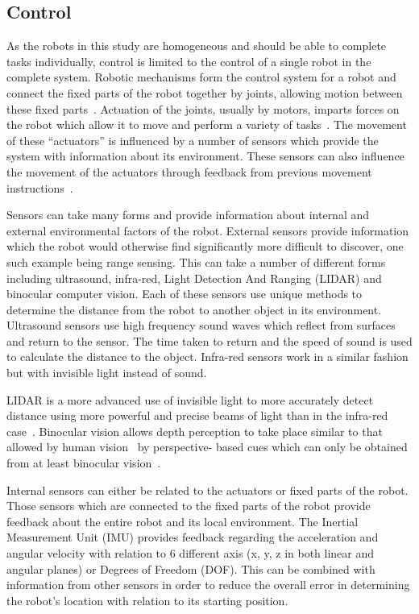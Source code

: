 \subsection{Control}\label{litreview/robotics/control}  
As the robots in this study are homogeneous and should be able to complete 
tasks individually, control is limited to the control of a single robot in the 
complete system. Robotic mechanisms form the control system for a robot and 
connect the fixed parts of the robot together by joints, allowing motion between 
these fixed parts~\cite{lynch2017modern}. Actuation of the joints, usually 
by motors, imparts forces on the robot which allow it to move and perform a 
variety of tasks~\cite{lynch2017modern}. The movement of these ``actuators'' 
is influenced by a number of sensors which provide the system with information 
about its environment. These sensors can also influence the movement of the 
actuators through feedback from previous movement instructions~\cite{lynch2017modern}.    

Sensors can take many forms and provide information about internal and external 
environmental factors of the robot. External sensors provide information which 
the robot would otherwise find significantly more difficult to discover, one 
such example being range sensing. This can take a number of different forms 
including ultrasound, infra-red, Light Detection And Ranging (LIDAR) and 
binocular computer vision. Each of these sensors use unique methods to determine 
the distance from the robot to another object in its environment. Ultrasound 
sensors use high frequency sound waves which reflect from surfaces and return 
to the sensor. The time taken to return and the speed of sound is used to 
calculate the distance to the object. Infra-red sensors work in a similar 
fashion but with invisible light instead of sound. 

LIDAR is a more advanced use of invisible light to more accurately detect 
distance using more powerful and precise beams of light than in the infra-red 
case~\cite{lidar}. Binocular vision allows depth perception to take place 
similar to that allowed by human vision~\cite{read2005early} by perspective-
based cues which can only be obtained from at least binocular 
vision~\cite{pfautz2002depth}. 

Internal sensors can either be related to the actuators or fixed parts of the 
robot. Those sensors which are connected to the fixed parts of the robot provide 
feedback about the entire robot and its local environment. The Inertial 
Measurement Unit (IMU) provides feedback regarding the acceleration and angular 
velocity with relation to 6 different axis (x, y, z in both linear and angular 
planes) or Degrees of Freedom (DOF). This can be combined with information from 
other sensors in order to reduce the overall error in determining the robot's 
location with relation to its starting position.  

